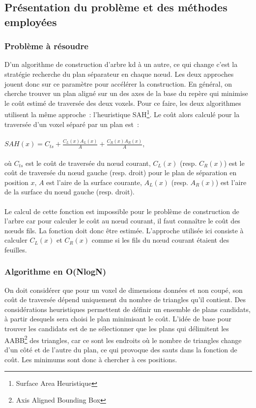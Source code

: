 \documentclass[a4paper]{article}
\begin{document}
\subsection{Présentation du problème et des méthodes employées}

\subsubsection{Problème à résoudre}
D'un algorithme de construction d'arbre kd à un autre, ce qui change c'est la stratégie recherche du plan séparateur en chaque nœud. Les deux approches jouent donc sur ce paramètre pour accélérer la construction. En général, on cherche trouver un plan aligné sur un des axes de la base du repère qui minimise le coût estimé de traversée des deux voxels. Pour ce faire, les deux algorithmes utilisent la même approche~: l'heuristique SAH\footnote{Surface Area Heuristique}. Le coût alors calculé pour la traversée d'un voxel séparé par un plan est~:
\\\\
$SAH(x) = C_{ts} + \frac{C_L(x)A_L(x)}{A} + \frac{C_R(x)A_R(x)}{A}$,
\\\\
où $C_{ts}$ est le coût de traversée du nœud courant, $C_L(x)$ (resp. $C_R(x)$) est le coût de traversée du nœud gauche (resp. droit) pour le plan de séparation en position $x$, $A$ est l'aire de la surface courante, $A_L(x)$ (resp. $A_R(x)$) est l'aire de la surface du nœud gauche (resp. droit).
\\\\
Le calcul de cette fonction est impossible pour le problème de construction de l'arbre car pour calculer le coût au nœud courant, il faut connaître le coût des nœuds fils. La fonction doit donc être estimée. L'approche utilisée ici consiste à calculer $C_L(x)$ et $C_R(x)$ comme si les fils du nœud courant étaient des feuilles.

\subsubsection{Algorithme en O(NlogN)}
On doit considérer que pour un voxel de dimensions données et non coupé, son coût de traversée dépend uniquement du nombre de triangles qu'il contient.
Des considérations heuristiques permettent de définir un ensemble de plans candidats, à partir desquels sera choisi le plan minimisant le coût. L'idée de base pour trouver les candidats est de ne sélectionner que les plans qui délimitent les AABB\footnote{Axis Aligned Bounding Box} des triangles, car ce sont les endroits où le nombre de triangles change d'un c\^oté et de l'autre du plan, ce qui provoque des sauts dans la fonction de co\^ut. Les minimums sont donc à chercher à ces positions.
\end{document}
